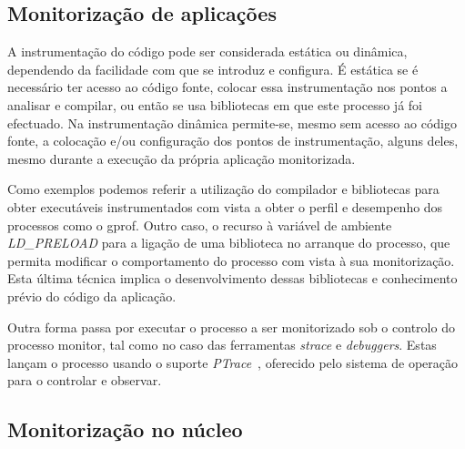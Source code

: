 \documentclass[a4paper]{llncs}
\newcommand{\td}[1]{\todo[inline]{#1}}
\begin{document}
\subsection{Monitorização de aplicações}
\label{sub:user_level_monitor}

A instrumentação do código pode ser considerada estática ou dinâmica, dependendo da facilidade com que se introduz e configura.
 É estática se é necessário ter acesso ao código fonte, colocar essa instrumentação nos pontos a analisar e compilar, ou então se usa bibliotecas em que este processo já foi efectuado.
 Na instrumentação dinâmica permite-se, mesmo sem acesso ao código fonte, a colocação e/ou configuração dos pontos de instrumentação, alguns deles, mesmo durante a execução da própria aplicação monitorizada. 


Como exemplos podemos referir a utilização do compilador e bibliotecas para obter executáveis instrumentados com vista a obter o perfil e desempenho dos processos como o gprof\cite{Graham:1982:GCG:800230.806987}.
Outro caso, o recurso à variável de ambiente \textit{LD\_PRELOAD} para a ligação de uma biblioteca no arranque do processo, que permita modificar o comportamento do processo com vista à sua monitorização. Esta última técnica implica o desenvolvimento dessas bibliotecas e conhecimento prévio do código da aplicação.

Outra forma passa por executar o processo a ser monitorizado sob o controlo do processo monitor, tal como no caso das ferramentas \textit{strace} e  \textit{debuggers}. Estas lançam o processo usando o suporte \textit{PTrace}~\cite{ptrace}, oferecido pelo sistema de operação para o controlar e observar. 

\subsection{Monitorização no núcleo}
\label{sub_kernel_instrumentation}
\end{document}
